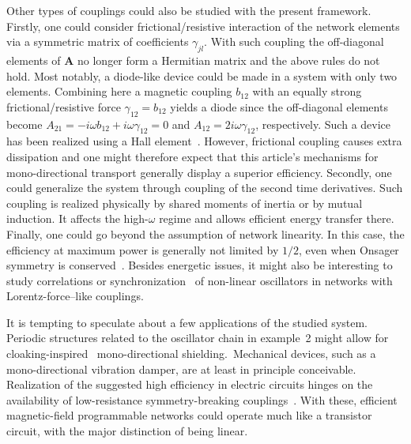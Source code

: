 \documentclass[doublecol,final,edchoice]{epl2}
\begin{document}
Other types of couplings could also be studied with the present framework. Firstly, one could consider frictional/resistive interaction of the network elements via a symmetric matrix of coefficients $\gamma_{jl}$. With such coupling the off-diagonal elements of $\mathbf{A}$ no longer form a Hermitian matrix and the above rules do not hold. Most notably, a diode-like device could be made in a system with only two elements. Combining here a magnetic coupling $b_{12}$ with an equally strong frictional/resistive force $\gamma_{12}=b_{12}$ yields a diode since the off-diagonal elements become $A_{21}=-i \omega b_{12}+i \omega \gamma_{12}=0$ and $A_{12}=2 i \omega \gamma_{12}$, respectively. Such a device has been realized using a Hall element~\cite{epl17030bib23,epl17030bib11}. However, frictional coupling causes extra dissipation and one might therefore expect that this article's mechanisms for mono-directional transport generally display a superior efficiency. Secondly, one could generalize the system through coupling of the second time derivatives. Such coupling is realized physically by shared moments of inertia or by mutual induction. It affects the high-$\omega$ regime and allows efficient energy transfer there. Finally, one could go beyond the assumption of network linearity. In this case, the efficiency at maximum power is generally not limited by $1/2$, even when Onsager symmetry is conserved~\cite{epl17030bib18}. Besides energetic issues, it might also be interesting to study correlations or synchronization~\cite{epl17030bib26,epl17030bib24,epl17030bib25} of non-linear oscillators in networks with Lorentz-force--like couplings.

It is tempting to speculate about a few applications of the studied system. Periodic structures related to the oscillator chain in example~2 might allow for \hbox{cloaking-inspired}~\cite{epl17030bib27} mono-directional shielding.~Mechanical devices, such as a mono-directional vibration damper, are at least in principle conceivable. Realization of the suggested high efficiency in electric circuits hinges on the availability of low-resistance symmetry-breaking couplings~\cite{epl17030bib28,epl17030bib29,epl17030bib30}. With these, efficient magnetic-field programmable networks could operate much like a transistor circuit, with the major distinction of being linear.

\end{document}
